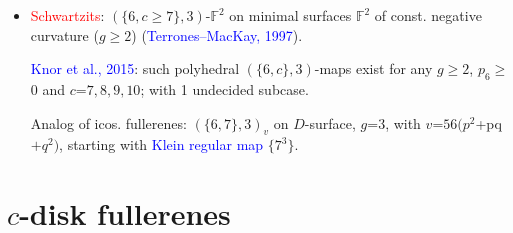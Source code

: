 \documentclass{beamer}
\begin{document}
\begin{frame}
\begin{itemize}
\item \textcolor{red}{Schwartzits}: $(\{6,c\ge 7\},3)$-$\mathbb{F}^2$
 on minimal 
surfaces $\mathbb{F}^2$
of const.
negative curvature ($g\ge 2$)  (\textcolor{blue}{Terrones--MacKay, 1997}).

 \textcolor{blue}{Knor et al., 2015}:
  such  polyhedral 
$(\{6,c\},3)$-maps exist for 
any $g$$\ge$$ 2$, $p_6$$\ge$$ 0$ and $c$=$7,8,9,10$; with 1 undecided subcase.%

Analog of icos. fullerenes: $(\{6,7\},3)_v$ on $D$-surface, $g$=$3$, with $v$=$56(p^2$+pq$+q^2)$, starting with 
\textcolor{blue}{Klein regular map}  $\{7^3\}$.


\end{itemize}
 
\end{frame}

\section[]{$c$-disk fullerenes}

\end{document}
